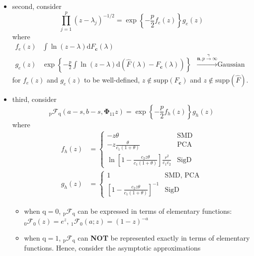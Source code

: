 \documentclass[twoside]{article}
\begin{document}
\begin{itemize}
    \item second, consider 
    \begin{equation}
        \prod^p_{j=1}(z-\lambda_j)^{-1/2} = \exp\left\{ -\frac{p}{2}f_e(z) \right\}g_e(z)
    \end{equation}
    where
    \begin{align}
        f_e(z) & \int \ln(z-\lambda)\mathrm{d}F_{\mathbf{c}}(\lambda) \\
        g_e(z) & \exp \left\{ -\frac{p}{2}\int \ln(z-\lambda) \mathrm{d}\left( \hat{F}(\lambda) - F_{\mathbf{c}}(\lambda) \right)\right\} & \xrightarrow{\mathbf{n},p\xrightarrow{\boldsymbol{\gamma}}\infty} \text{Gaussian random variable}
    \end{align}
    for $f_e(z)$ and $g_e(z)$ to be well-defined, $z\not\in\mathrm{supp}(F_{\mathbf{c}})$ and $z\not\in\mathrm{supp}(\hat{F})$.
    \item third, consider 
    \begin{equation}
        _{\mathrm{p}}\mathcal{F}_{\mathrm{q}} (a-s,b-s,\boldsymbol{\Phi}_{11}z) = \exp\left\{ -\frac{p}{2}f_h(z) \right\}g_h(z)
    \end{equation}
    where 
    \begin{align}
        f_h(z) &= \begin{cases}
            -z\theta & \text{SMD}\\
            -z\frac{\theta}{c_1(1+\theta)} & \text{PCA} \\
            \ln\left[1-\frac{c_2z\theta}{c_1(1+\theta)}\right]\frac{r^2}{c_1c_2} & \text{SigD}
        \end{cases}\\
        g_h(z) &= \begin{cases}
            1 & \text{SMD, PCA}\\
            \left[1-\frac{c_2z\theta}{c_1(1+\theta)}\right]^{-1} & \text{SigD}
        \end{cases}
    \end{align}
    \begin{itemize}
        \item when $\mathrm{q}=0$, $_{\mathrm{p}}\mathcal{F}_{\mathrm{q}}$ can be expressed in terms of elementary functions: $_{\mathrm{0}}\mathcal{F}_{\mathrm{0}}(z)=e^z$, $_{\mathrm{1}}\mathcal{F}_{\mathrm{0}}(a;z)=(1-z)^{-a}$
        \item when $\mathrm{q}=1$, $_{\mathrm{p}}\mathcal{F}_{\mathrm{q}}$ can \textbf{NOT} be represented exactly in terms of elementary functions. Hence, consider the asymptotic approximations

\end{itemize}
\end{itemize}
\end{document}
